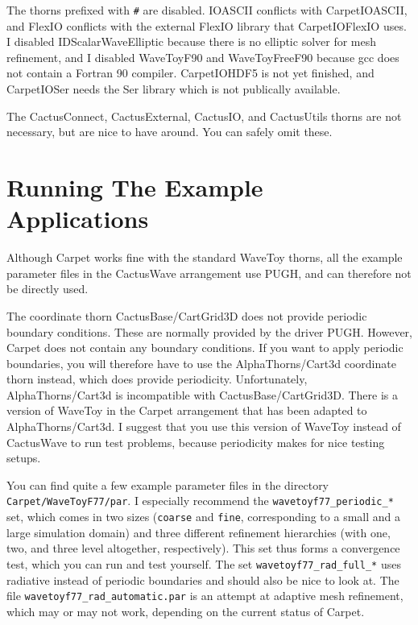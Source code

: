 The thorns prefixed with \texttt{\#} are disabled.  IOASCII conflicts
with CarpetIOASCII, and FlexIO conflicts with the external FlexIO
library that CarpetIOFlexIO uses.  I disabled IDScalarWaveElliptic
because there is no elliptic solver for mesh refinement, and I
disabled WaveToyF90 and WaveToyFreeF90 because gcc does not contain a
Fortran 90 compiler.  CarpetIOHDF5 is not yet finished, and
CarpetIOSer needs the Ser library which is not publically available.

The CactusConnect, CactusExternal, CactusIO, and CactusUtils thorns
are not necessary, but are nice to have around.  You can safely omit
these.



\section{Running The Example Applications}

Although Carpet works fine with the standard WaveToy thorns, all the
example parameter files in the CactusWave arrangement use PUGH, and
can therefore not be directly used.

The coordinate thorn CactusBase/CartGrid3D does not provide periodic
boundary conditions.  These are normally provided by the driver PUGH.
However, Carpet does not contain any boundary conditions.  If you want
to apply periodic boundaries, you will therefore have to use the
AlphaThorns/Cart3d coordinate thorn instead, which does provide
periodicity.  Unfortunately, AlphaThorns/Cart3d is incompatible with
CactusBase/CartGrid3D.  There is a version of WaveToy in the Carpet
arrangement that has been adapted to AlphaThorns/Cart3d.  I suggest
that you use this version of WaveToy instead of CactusWave to run test
problems, because periodicity makes for nice testing setups.

You can find quite a few example parameter files in the directory
\texttt{Carpet/WaveToyF77/par}.  I especially recommend the
\texttt{wavetoyf77\_periodic\_*} set, which comes in two sizes
(\texttt{coarse} and \texttt{fine}, corresponding to a small and a
large simulation domain) and three different refinement hierarchies
(with one, two, and three level altogether, respectively).  This set
thus forms a convergence test, which you can run and test yourself.
The set \texttt{wavetoyf77\_rad\_full\_*} uses radiative instead of
periodic boundaries and should also be nice to look at.  The file
\texttt{wavetoyf77\_rad\_automatic.par} is an attempt at adaptive mesh
refinement, which may or may not work, depending on the current status
of Carpet.

